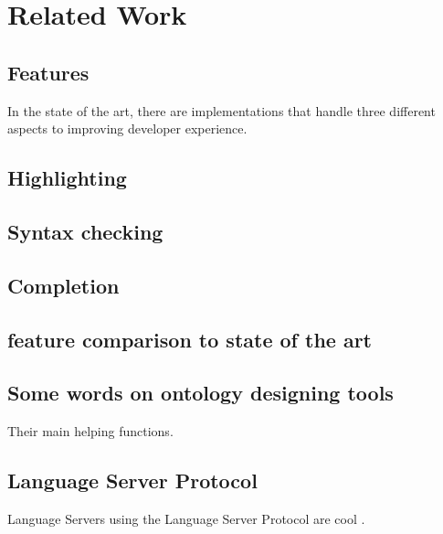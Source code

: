 \section{Related Work}%
\label{sec:related_work}

\subsection{Features}
In the state of the art, there are implementations that handle three different aspects to improving developer experience.

\subsection*{Highlighting}

\subsection*{Syntax checking}

\subsection*{Completion}

\subsection*{feature comparison to state of the art}

\subsection*{Some words on ontology designing tools}
Their main helping functions\cite{ComparingOntologyBuildingTools}.

\subsection{Language Server Protocol}

Language Servers using the Language Server Protocol\cite{IntroToLsp} 
are cool \cite{GLSPFlexibility}.

